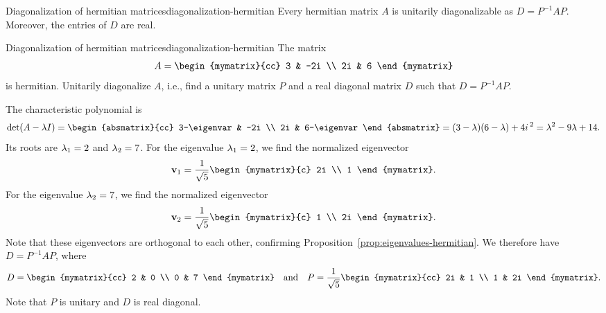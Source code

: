 \begin{theorem}{Diagonalization of hermitian matrices}{diagonalization-hermitian}
  Every hermitian matrix $A$ is unitarily diagonalizable as
  $D = P^{-1}AP$. Moreover, the entries of $D$ are real.
\end{theorem}

\begin{example}{Diagonalization of hermitian matrices}{diagonalization-hermitian}
  The matrix
  \begin{equation*}
    A = \begin{mymatrix}{cc}  3 & -2i \\ 2i & 6 \end{mymatrix}
  \end{equation*}
  is hermitian. Unitarily diagonalize $A$, i.e., find a unitary matrix
  $P$ and a real diagonal matrix $D$ such that $D = P^{-1}AP$.
\end{example}

\begin{solution}
  The characteristic polynomial is
  \begin{equation*}
    \det(A-\eigenvar I)
    = \begin{absmatrix}{cc} 3-\eigenvar & -2i \\ 2i & 6-\eigenvar \end{absmatrix}
    = (3-\eigenvar)(6-\eigenvar) + 4i\,^2
    = \eigenvar^2 - 9\eigenvar + 14.
  \end{equation*}
  Its roots are $\lambda_1=2$ and $\lambda_2=7$. For the eigenvalue
  $\lambda_1=2$, we find the normalized eigenvector
  \begin{equation*}
    \vect{v}_1 = \frac{1}{\sqrt{5}}\begin{mymatrix}{c} 2i \\ 1 \end{mymatrix}.
  \end{equation*}
  For the eigenvalue
  $\lambda_2=7$, we find the normalized eigenvector
  \begin{equation*}
    \vect{v}_2 = \frac{1}{\sqrt{5}}\begin{mymatrix}{c} 1 \\ 2i \end{mymatrix}.
  \end{equation*}
  Note that these eigenvectors are orthogonal to each other,
  confirming Proposition~\ref{prop:eigenvalues-hermitian}. We
  therefore have $D=P^{-1}AP$, where
  \begin{equation*}
    D = \begin{mymatrix}{cc} 2 & 0 \\ 0 & 7 \end{mymatrix}
    \quad\mbox{and}\quad
    P = \frac{1}{\sqrt{5}} \begin{mymatrix}{cc} 2i & 1 \\ 1 & 2i \end{mymatrix}.
  \end{equation*}
  Note that $P$ is unitary and $D$ is real diagonal.
\end{solution}
